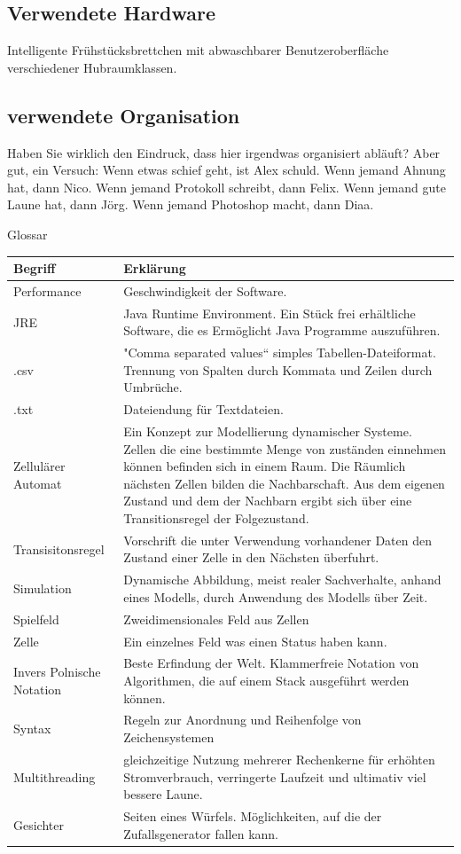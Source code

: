 \documentclass[11pt,a4paper]{article}
\begin{document}
\subsection{Verwendete Hardware}
Intelligente Frühstücksbrettchen mit abwaschbarer Benutzeroberfläche verschiedener Hubraumklassen.
\subsection{verwendete Organisation}
Haben Sie wirklich den Eindruck, dass hier irgendwas organisiert abläuft? 
Aber gut, ein Versuch: 
Wenn etwas schief geht, ist Alex schuld.
Wenn jemand Ahnung hat, dann Nico.
Wenn jemand Protokoll schreibt, dann Felix.
Wenn jemand gute Laune hat, dann Jörg.
Wenn jemand Photoshop macht, dann Diaa.

\pagebreak


\par
Glossar
\par
\begin{longtable}[m]{|m{8cm}|m{8cm}|}
\hline
Begriff & Erklärung \\
    \hline
  Performance   & Geschwindigkeit der Software. \\
  \hline
JRE  & Java Runtime Environment. Ein Stück frei erhältliche Software, die es Ermöglicht Java Programme auszuführen. \\
    \hline
.csv  & "Comma separated values“ simples Tabellen-Dateiformat. Trennung von Spalten durch Kommata und Zeilen durch Umbrüche. \\
    \hline
.txt  & Dateiendung für Textdateien.\\
    \hline
 Zellulärer Automat & Ein Konzept zur Modellierung dynamischer Systeme.
Zellen die eine bestimmte Menge von zuständen einnehmen können befinden sich in einem Raum. Die Räumlich nächsten Zellen bilden die Nachbarschaft. Aus dem eigenen Zustand und dem der Nachbarn ergibt sich über eine Transitionsregel der Folgezustand.
\\
    \hline
 Transisitonsregel & Vorschrift die unter Verwendung vorhandener Daten den Zustand einer Zelle in den Nächsten überfuhrt.\\  
  \hline
 Simulation & Dynamische Abbildung, meist realer Sachverhalte, anhand eines Modells, durch Anwendung des Modells über Zeit.\\
  \hline
  Spielfeld & Zweidimensionales Feld aus Zellen\\
  \hline
  Zelle & Ein einzelnes Feld was einen Status haben kann.\\
  \hline
  Invers Polnische Notation & Beste Erfindung der Welt. Klammerfreie Notation von Algorithmen, die auf einem Stack ausgeführt werden können.\\
  \hline
  Syntax & Regeln zur Anordnung und Reihenfolge von Zeichensystemen\\
  \hline
  Multithreading & gleichzeitige Nutzung mehrerer Rechenkerne für erhöhten Stromverbrauch, verringerte Laufzeit und ultimativ viel bessere Laune.\\
 \hline
 Gesichter & Seiten eines Würfels. Möglichkeiten, auf die der Zufallsgenerator fallen kann.\\
 \hline
\end{longtable}
\end{document}
